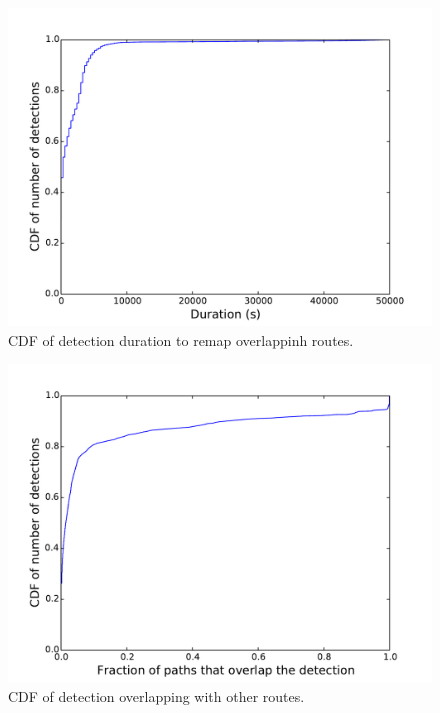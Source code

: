 \begin{figure}[t]
\begin{center}
\includegraphics[width=0.8\columnwidth]{figs/patching/durationdetection.pdf}
\caption{CDF of detection duration to remap overlappinh routes. }
\label{fig:branch.acc}
\end{center}
%
\end{figure}
%
\begin{figure}[t]
\begin{center}
\includegraphics[width=0.8\columnwidth]{figs/patching/routesoverlapping.pdf}
\caption{CDF of detection overlapping with other routes.}
\label{fig:join.acc}
\end{center}
%
\end{figure}

